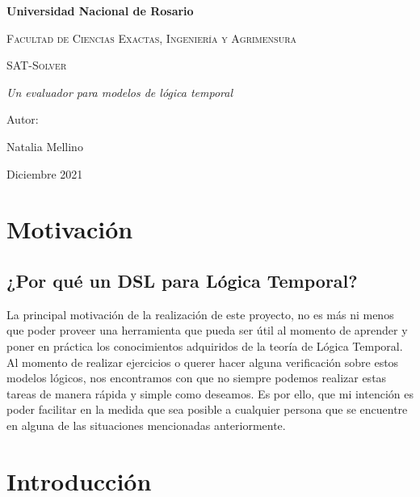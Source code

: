 \documentclass[11pt]{article}
\begin{document}

\begin{titlepage}
    \centering
    {\bfseries\LARGE Universidad Nacional de Rosario \par}
    \vspace{1cm}
    {\scshape\Large Facultad de Ciencias Exactas, Ingeniería y Agrimensura \par}
    \vspace{3cm}
    {\scshape\Huge SAT-Solver \par}
    \vspace{3cm}
    {\itshape\Large Un evaluador para modelos de lógica temporal \par}
    \vfill
    {\Large Autor: \par}
    {\Large Natalia Mellino \par}
    \vfill
    {\Large Diciembre 2021 \par}
\end{titlepage}

\tableofcontents

\newpage

\section{Motivación}

\subsection{¿Por qué un DSL para Lógica Temporal?}

La principal motivación de la realización de este proyecto, no es más ni menos
que poder proveer una herramienta que pueda ser útil al momento de aprender y
poner en práctica los conocimientos adquiridos de la teoría de Lógica Temporal. \\

Al momento de realizar ejercicios o querer hacer alguna verificación sobre estos
modelos lógicos, nos encontramos con que no siempre podemos realizar estas tareas 
de manera rápida y simple como deseamos. Es por ello, que mi intención es poder 
facilitar en la medida que sea posible a cualquier persona que se encuentre en 
alguna de las situaciones mencionadas anteriormente.  

\section{Introducción}
\end{document}
